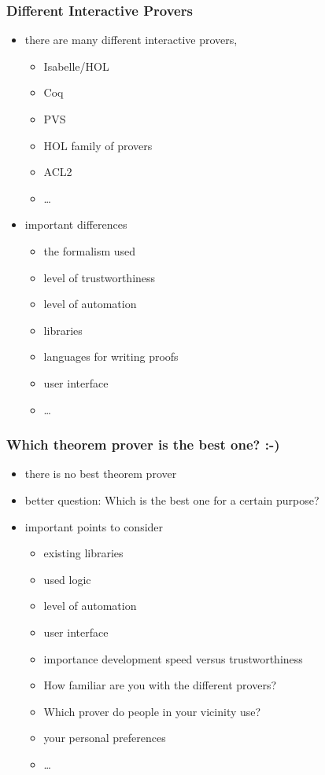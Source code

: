 \begin{frame}
\frametitle{Different Interactive Provers}

\begin{itemize}
\item there are many different interactive provers, \eg
\begin{itemize}
\item Isabelle/HOL 
\item Coq 
\item PVS
\item HOL family of provers
\item ACL2
\item \ldots 
\end{itemize}
\item important differences
\begin{itemize}
\item the formalism used
\item level of trustworthiness
\item level of automation
\item libraries
\item languages for writing proofs
\item user interface
\item \ldots
\end{itemize}
\end{itemize}
\end{frame}


\begin{frame}
\frametitle{Which theorem prover is the best one? :-)}

\begin{itemize}
\item there is no \alert{best} theorem prover
\item better question: Which is the \alert{best one for a certain purpose}?
\item important points to consider
\begin{itemize}
\item existing libraries
\item used logic 
\item level of automation
\item user interface
\item importance development speed versus trustworthiness
\item How familiar are you with the different provers?
\item Which prover do people in your vicinity use?
\item your personal preferences
\item \ldots 
\end{itemize}
\end{itemize}

\end{frame}

